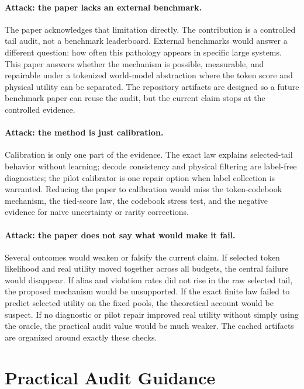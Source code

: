 \paragraph{Attack: the paper lacks an external benchmark.}
The paper acknowledges that limitation directly. The contribution is a controlled tail audit, not a benchmark leaderboard. External benchmarks would answer a different question: how often this pathology appears in specific large systems. This paper answers whether the mechanism is possible, measurable, and repairable under a tokenized world-model abstraction where the token score and physical utility can be separated. The repository artifacts are designed so a future benchmark paper can reuse the audit, but the current claim stops at the controlled evidence.

\paragraph{Attack: the method is just calibration.}
Calibration is only one part of the evidence. The exact law explains selected-tail behavior without learning; decode consistency and physical filtering are label-free diagnostics; the pilot calibrator is one repair option when label collection is warranted. Reducing the paper to calibration would miss the token-codebook mechanism, the tied-score law, the codebook stress test, and the negative evidence for naive uncertainty or rarity corrections.

\paragraph{Attack: the paper does not say what would make it fail.}
Several outcomes would weaken or falsify the current claim. If selected token likelihood and real utility moved together across all budgets, the central failure would disappear. If alias and violation rates did not rise in the raw selected tail, the proposed mechanism would be unsupported. If the exact finite law failed to predict selected utility on the fixed pools, the theoretical account would be suspect. If no diagnostic or pilot repair improved real utility without simply using the oracle, the practical audit value would be much weaker. The cached artifacts are organized around exactly these checks.

\section{Practical Audit Guidance}
\label{app:practical-guidance}

